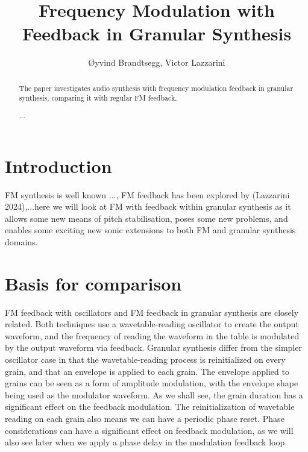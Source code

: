 \documentclass[runningheads,a4paper]{llncs}
\newcommand{\keywords}[1]{\par\addvspace\baselineskip
\noindent\keywordname\enspace\ignorespaces#1}
\begin{document}
\mainmatter  %

\title{Frequency Modulation with Feedback in Granular Synthesis}




\author{Øyvind Brandtsegg, Victor Lazzarini}
%




\maketitle

\begin{abstract}

The paper investigates audio synthesis with frequency modulation feedback in granular synthesis, comparing it with regular FM feedback. 

\keywords{...}
\end{abstract}


\section{Introduction}
FM synthesis is well known ..., FM feedback has been explored by (Lazzarini 2024),...here we will look at FM with feedback within granular synthesis as it allows some new means of pitch stabilisation, poses some new problems, and enables some exciting new sonic extensions to both FM and granular synthesis domains.

\section{Basis for comparison}
FM feedback with oscillators and FM feedback in granular synthesis are closely related. Both techniques use a wavetable-reading oscillator to create the output waveform, and the frequency of reading the waveform in the table is modulated by the output waveform via feedback. Granular synthesis differ from the simpler oscillator case in that the wavetable-reading process is reinitialized on every grain, and that an envelope is applied to each grain. The envelope applied to grains can be seen as a form of amplitude modulation, with the envelope shape being used as the modulator waveform. As we shall see, the grain duration has a significant effect on the feedback modulation. The reinitialization of wavetable reading on each grain also means we can have a periodic phase reset. Phase considerations can have a significant effect on feedback modulation, as we will also see later when we apply a phase delay in the modulation feedback loop.
\end{document}
